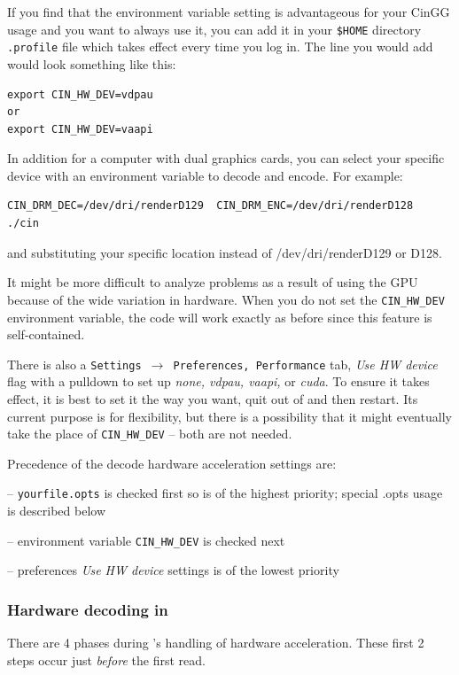 If you find that the environment variable setting is advantageous for your CinGG usage and you want to always use it, you can add it in your \texttt{\$HOME} directory \texttt{.profile} file which takes effect every time you log in.  The line you would add would look something like this:

\begin{lstlisting}[numbers=none]
export CIN_HW_DEV=vdpau
or
export CIN_HW_DEV=vaapi
\end{lstlisting}

In addition for a computer with dual graphics cards, you can select your specific device with an environment variable
to decode and encode.  For example:
\begin{lstlisting}[numbers=none]
CIN_DRM_DEC=/dev/dri/renderD129  CIN_DRM_ENC=/dev/dri/renderD128   ./cin
\end{lstlisting}
and substituting your specific location instead of /dev/dri/renderD129 or D128.

It might be more difficult to analyze problems as a result of using the GPU because of the wide variation in hardware.  When you do not set the \texttt{CIN\_HW\_DEV} environment variable, the code will work exactly as before since this feature is self-contained.

There is also a \texttt{Settings $\rightarrow$ Preferences, Performance} tab, \textit{Use HW device} flag
with a pulldown to set up \textit{none, vdpau, vaapi,} or \textit{cuda}.  To ensure it takes effect, it is best to set it the way you want, quit out of \CGG{} and then restart.  Its current purpose is for flexibility, but there is a possibility that it might eventually take the place of \texttt{CIN\_HW\_DEV} -- both are not needed.

Precedence of the decode hardware acceleration settings are:

-- \texttt{yourfile.opts} is checked first so is of the highest priority; special .opts usage is described below

-- environment variable \texttt{CIN\_HW\_DEV} is checked next

-- preferences \textit{Use HW device} settings is of the lowest priority

\subsubsection*{Hardware decoding in \CGG{}}%
\label{ssub:hardware_decoding_cinelerra}
There are 4 phases during \CGG{}’s handling of hardware acceleration. These first 2 steps occur just \textit{before} the first read.

